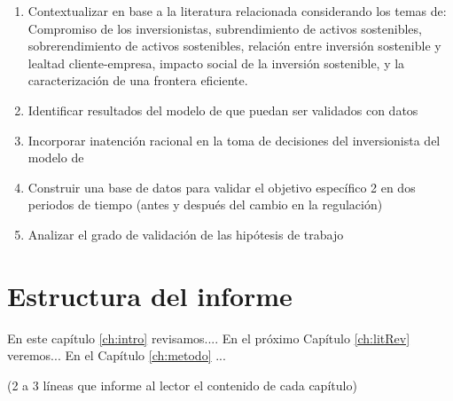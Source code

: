 \begin{enumerate}
    \item Contextualizar en base a la literatura relacionada considerando los temas de: Compromiso de los inversionistas, subrendimiento de activos sostenibles, sobrerendimiento de activos sostenibles, relación entre inversión sostenible y lealtad cliente-empresa, impacto social de la inversión sostenible, y la caracterización de una frontera eficiente.
    \item Identificar resultados del modelo de \cite{pastor_sustainable_2021} que puedan ser validados con datos
    \item Incorporar inatención racional en la toma de decisiones del inversionista del modelo de \cite{pastor_sustainable_2021}
    \item Construir una base de datos para validar el objetivo específico 2 en dos periodos de tiempo (antes y después del cambio en la regulación)
    \item Analizar el grado de validación de las hipótesis de trabajo
\end{enumerate}


\section{Estructura del informe}

En este capítulo \ref{ch:intro} revisamos.... En el próximo Capítulo \ref{ch:litRev} veremos... En el Capítulo \ref{ch:metodo} ...

{\color{blue} (2 a 3 líneas que informe al lector el contenido de cada capítulo) }